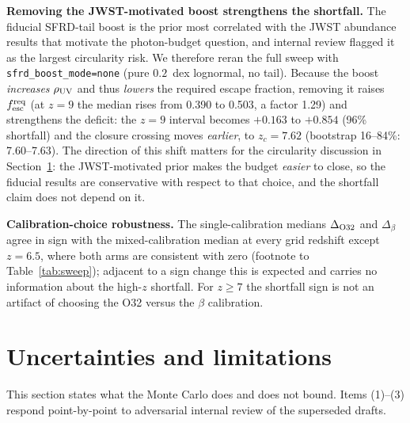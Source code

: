 \documentclass[twocolumn]{aastex702}
\begin{document}
\textbf{Removing the JWST-motivated boost strengthens the shortfall.} The fiducial SFRD-tail boost is the prior most correlated with the JWST abundance results that motivate the photon-budget question, and internal review flagged it as the largest circularity risk. We therefore reran the full sweep with \texttt{sfrd\_boost\_mode=none} (pure $0.2$~dex lognormal, no tail). Because the boost \emph{increases} $\rho_{\rm UV}$ and thus \emph{lowers} the required escape fraction, removing it raises $f_{\rm esc}^{\rm req}$ (at $z=9$ the median rises from 0.390 to 0.503, a factor 1.29) and strengthens the deficit: the $z=9$ interval becomes $+0.163$ to $+0.854$ (96\% shortfall) and the closure crossing moves \emph{earlier}, to $z_c=7.62$ (bootstrap 16--84\%: 7.60--7.63). The direction of this shift matters for the circularity discussion in Section~\ref{sec:uncertainties}: the JWST-motivated prior makes the budget \emph{easier} to close, so the fiducial results are conservative with respect to that choice, and the shortfall claim does not depend on it.

\textbf{Calibration-choice robustness.} The single-calibration medians $\Delta_{\rm O32}$ and $\Delta_\beta$ agree in sign with the mixed-calibration median at every grid redshift except $z=6.5$, where both arms are consistent with zero (footnote to Table~\ref{tab:sweep}); adjacent to a sign change this is expected and carries no information about the high-$z$ shortfall. For $z\ge7$ the shortfall sign is not an artifact of choosing the O32 versus the $\beta$ calibration.

\section{Uncertainties and limitations}
\label{sec:uncertainties}
This section states what the Monte Carlo does and does not bound. Items (1)--(3) respond point-by-point to adversarial internal review of the superseded drafts.
\end{document}
